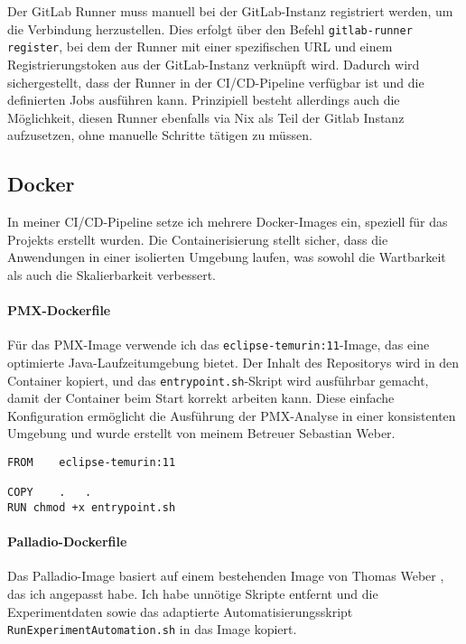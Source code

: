 Der GitLab Runner muss manuell bei der GitLab-Instanz registriert werden, um die Verbindung herzustellen. Dies erfolgt über den Befehl \texttt{gitlab-runner register}, bei dem der Runner mit einer spezifischen URL und einem Registrierungstoken aus der GitLab-Instanz verknüpft wird. Dadurch wird sichergestellt, dass der Runner in der CI/CD-Pipeline verfügbar ist und die definierten Jobs ausführen kann. Prinzipiell besteht allerdings auch die Möglichkeit, diesen Runner ebenfalls via Nix als Teil der Gitlab Instanz aufzusetzen, ohne manuelle Schritte tätigen zu müssen.

\subsection{Docker}
In meiner CI/CD-Pipeline setze ich mehrere Docker-Images ein, speziell für das Projekts erstellt wurden. Die Containerisierung stellt sicher, dass die Anwendungen in einer isolierten Umgebung laufen, was sowohl die Wartbarkeit als auch die Skalierbarkeit verbessert.

\paragraph*{PMX-Dockerfile}
Für das PMX-Image verwende ich das \texttt{eclipse-temurin:11}-Image, das eine optimierte Java-Laufzeitumgebung bietet. Der Inhalt des Repositorys wird in den Container kopiert, und das \texttt{entrypoint.sh}-Skript wird ausführbar gemacht, damit der Container beim Start korrekt arbeiten kann. Diese einfache Konfiguration ermöglicht die Ausführung der PMX-Analyse in einer konsistenten Umgebung und wurde erstellt von meinem Betreuer Sebastian Weber. 

\begin{verbatim}
FROM	eclipse-temurin:11

COPY	.	.
RUN	chmod +x entrypoint.sh
\end{verbatim}

\paragraph*{Palladio-Dockerfile}
Das Palladio-Image basiert auf einem bestehenden Image von Thomas Weber \cite{thomas}, das ich angepasst habe. Ich habe unnötige Skripte entfernt und die Experimentdaten sowie das adaptierte Automatisierungsskript \texttt{RunExperimentAutomation.sh} in das Image kopiert. 

